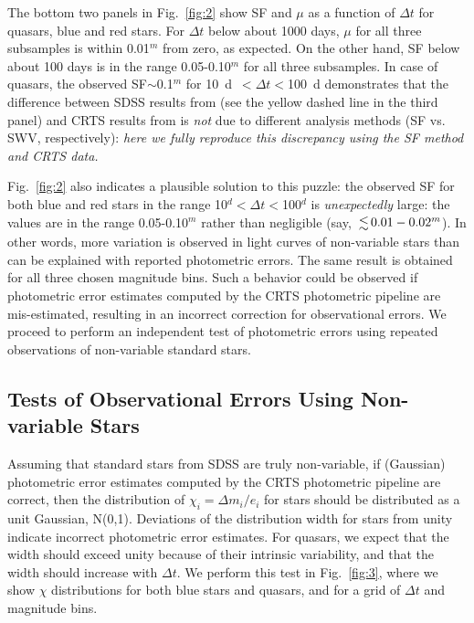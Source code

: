 \documentclass[fleqn,usenatbib]{mnras}
\begin{document}
The bottom two panels in Fig.~\ref{fig:2} show SF and $\mu$ as a function of $\Delta t$ for quasars, blue 
and red stars. For $\Delta t$ below about 1000 days, $\mu$ for all three subsamples is within 0.01$^m$
from zero, as expected. On the other hand, SF below about 100 days is in the range 0.05-0.10$^m$ for
all three subsamples. In case of quasars, the observed SF$\sim$0.1$^m$ for \mbox{10 d $<\Delta t<$100 d}
demonstrates that the difference between SDSS results from \cite{macleod2010} (see the yellow dashed
line in the third panel) and CRTS results from \cite{graham2014} is {\it not} due to different analysis 
methods (SF vs. SWV, respectively): {\it here we fully reproduce this discrepancy using the SF method and 
CRTS data.} 

Fig.~\ref{fig:2} also indicates a plausible solution to this puzzle: the observed SF for both blue and red
stars in the range \mbox{10$^d<\Delta t<$100$^d$} is {\it unexpectedly} large: the values are in the range 
0.05-0.10$^m$ rather than negligible (say, $\la 0.01-0.02^m$). In other words, more variation is 
observed in light curves of non-variable stars than can be explained with reported photometric errors.
The same result is obtained for all three chosen magnitude bins. Such a behavior could be observed if 
photometric error estimates computed by the CRTS photometric pipeline are mis-estimated, resulting
in an incorrect correction for observational errors. We proceed to perform an independent test of 
photometric errors using repeated observations of non-variable standard stars. 


\subsection{Tests of Observational Errors Using Non-variable Stars}
\label{sec:results}

Assuming that standard stars from SDSS are truly non-variable, if (Gaussian) photometric error estimates 
computed by the CRTS photometric pipeline are correct, then the distribution of $\chi_i= \Delta m_i / e_i$ 
for stars should be distributed as a unit Gaussian, N(0,1). Deviations of the distribution width for stars 
from unity indicate incorrect photometric error estimates. For quasars, we expect that the width should
exceed unity because of their intrinsic variability, and that the width should increase with $\Delta t$. 
We perform this test in Fig.~\ref{fig:3}, where we show $\chi$ distributions for both blue stars and quasars, 
and for a grid of $\Delta t$ and magnitude bins. 
\end{document}
